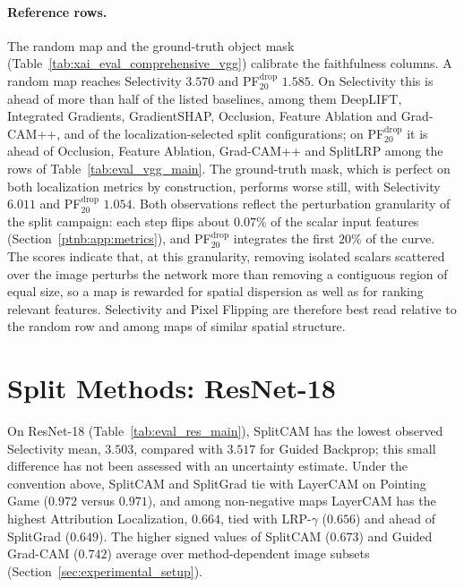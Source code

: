 \paragraph{Reference rows.}
The random map and the ground-truth object mask (Table~\ref{tab:xai_eval_comprehensive_vgg}) calibrate the faithfulness columns. A random map reaches Selectivity $3.570$ and PF$^{\mathrm{drop}}_{20}$ $1.585$. On Selectivity this is ahead of more than half of the listed baselines, among them DeepLIFT, Integrated Gradients, GradientSHAP, Occlusion, Feature Ablation and Grad-CAM++, and of the localization-selected split configurations; on PF$^{\mathrm{drop}}_{20}$ it is ahead of Occlusion, Feature Ablation, Grad-CAM++ and SplitLRP among the rows of Table~\ref{tab:eval_vgg_main}. The ground-truth mask, which is perfect on both localization metrics by construction, performs worse still, with Selectivity $6.011$ and PF$^{\mathrm{drop}}_{20}$ $1.054$. Both observations reflect the perturbation granularity of the split campaign: each step flips about $0.07\%$ of the scalar input features (Section~\ref{ptnb:app:metrics}), and PF$^{\mathrm{drop}}_{20}$ integrates the first $20\%$ of the curve. The scores indicate that, at this granularity, removing isolated scalars scattered over the image perturbs the network more than removing a contiguous region of equal size, so a map is rewarded for spatial dispersion as well as for ranking relevant features. Selectivity and Pixel Flipping are therefore best read relative to the random row and among maps of similar spatial structure.

\section{Split Methods: ResNet-18}\label{sec:results_resnet}



On ResNet-18 (Table~\ref{tab:eval_res_main}), SplitCAM has the lowest observed Selectivity mean, $3.503$, compared with $3.517$ for Guided Backprop; this small difference has not been assessed with an uncertainty estimate. Under the convention above, SplitCAM and SplitGrad tie with LayerCAM on Pointing Game ($0.972$ versus $0.971$), and among non-negative maps LayerCAM has the highest Attribution Localization, $0.664$, tied with LRP-$\gamma$ ($0.656$) and ahead of SplitGrad ($0.649$). The higher signed values of SplitCAM ($0.673$) and Guided Grad-CAM ($0.742$) average over method-dependent image subsets (Section~\ref{sec:experimental_setup}).

